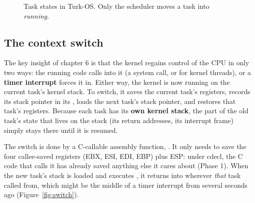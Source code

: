 \documentclass[11pt,a4paper]{article}
\begin{document}
\begin{figure}[htbp]
\centering
{}
\caption{Task states in Turk-OS. Only the scheduler moves a task into \emph{running}.}
\label{fig:states}
\end{figure}

\subsection{The context switch}

The key insight of \OSTEP chapter 6 is that the kernel regains control of the CPU in only two ways: the running code
calls into it (a system call, or  for kernel threads), or a \textbf{timer interrupt} forces it in. Either
way, the kernel is now running on the current task's kernel stack. To switch, it saves the current task's registers,
records its stack pointer in its , loads the next task's stack pointer, and restores that task's
registers. Because each task has its \textbf{own kernel stack}, the part of the old task's state that lives on the
stack (its return addresses, its interrupt frame) simply stays there until it is resumed.

The switch is done by a C-callable assembly function, . It only needs to save the four
callee-saved registers (EBX, ESI, EDI, EBP) plus ESP: under cdecl, the C code that calls it has already saved anything
else it cares about (Phase 1). When the new task's stack is loaded and  executes , it
returns into wherever \emph{that} task called  from, which might be the middle of a timer
interrupt from several seconds ago (Figure~\ref{fig:switch}).
\end{document}
